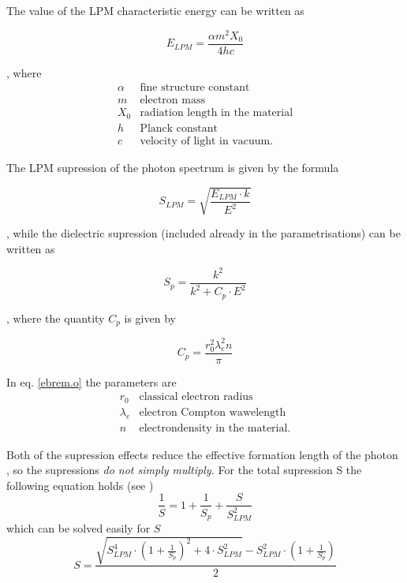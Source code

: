 The value of the LPM characteristic energy can be written as

\begin{equation}
\label{ebrem.l}
  E_{LPM} = \frac{\alpha m^2 X_0}{4 h c}
\end{equation}

 , where
\[
\begin{array}{ll}
\alpha  & \mbox{fine structure constant} \\
m       & \mbox{electron mass} \\
X_0     & \mbox{radiation length in the material} \\
h       & \mbox{Planck constant} \\
c       & \mbox{velocity of light in vacuum.}
\end{array} 
\]

 The LPM supression of the photon spectrum is given by the formula

\begin{equation}
\label{ebrem.m}
  S_{LPM} = \sqrt{\frac{E_{LPM} \cdot k}{E^2}}
\end{equation}

, while the dielectric supression (included already in the parametrisations) 
can be written as

\begin{equation}
\label{ebrem.n}
  S_p = \frac{k^2}{k^2 + C_p \cdot E^2}
\end{equation}

 , where the quantity $C_p$ is given by

\begin{equation}
\label{ebrem.o}
   C_p = \frac{r^2_0 \lambda^2_e n}{\pi}
\end{equation}

In eq. \ref{ebrem.o} the parameters are
\[
\begin{array}{ll}
r_0     & \mbox{classical electron radius} \\
\lambda_e & \mbox{electron Compton wawelength} \\
n       & \mbox{electrondensity in the material.}
\end{array}
\]

 Both of the supression effects reduce the effective formation length
of the photon , so the supressions {\em do not simply multiply.} For the
total supression S the following equation holds (see \cite{ebrem.galitsky})
\begin{equation}
\label{ebrem.p}
  \frac{1}{S} = 1 + \frac{1}{S_p} + \frac{S}{S^2_{LPM}}
\end{equation}
 which can be solved easily for $S$
\begin{equation}
\label{ebrem.q}
  S = \frac{\sqrt{S^4_{LPM}\cdot (1 + \frac{1}{S_p})^2 + 4 \cdot S^2_{LPM}}
      -S^2_{LPM} \cdot (1 + \frac{1}{S_p})}{2}
\end{equation}
 
